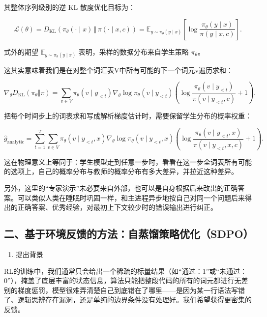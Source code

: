 其整体序列级别的逆 KL 散度优化目标为：

\[
\mathcal{L}(\theta)
= D_{\mathrm{KL}}\left(\pi_\theta(\cdot \mid x)\,\Vert\,\pi(\cdot \mid x,c)\right)
= \mathbb{E}_{y\sim \pi_\theta(y\mid x)}
\left[
\log\frac{\pi_\theta(y\mid x)}{\pi(y\mid x,c)}
\right].
\]

式外的期望 \(\mathbb{E}_{y\sim \pi_\theta(y\mid x)}\) 表明，采样的数据分布来自学生策略 \(\pi_\theta\)。

这其实意味着我们是在对整个词汇表V中所有可能的下一个词元v遍历求和：

\[
\nabla_\theta D_{\mathrm{KL}}(\pi_\theta\Vert\pi)
=
\sum_{v\in V}
\pi_\theta(v\mid y_{<t})
\nabla_\theta \log \pi_\theta(v\mid y_{<t})
\left(
\log\frac{\pi_\theta(v\mid y_{<t})}{\pi(v\mid y_{<t},c)}
+ 1
\right).
\]

把每个时间步上的词表求和写成解析梯度估计时，需要保留学生分布的概率权重：

\[
\hat{g}_{\mathrm{analytic}}
=
\sum_{t=1}^{T}\sum_{v\in V}
\pi_\theta(v\mid y_{<t},x)
\nabla_\theta \log \pi_\theta(v\mid y_{<t},x)
\left(
\log\frac{\pi_\theta(v\mid y_{<t},x)}{\pi(v\mid y_{<t},x,c)}
+1
\right).
\]

这在物理意义上等同于：学生模型走到任意一步时，看看在这一步全词表所有可能的选项上，自己的概率分布与教师的概率分布有多大差异，并拉近这种差异。

另外，这里的``专家演示''未必要来自外部，也可以是自身根据后来改出的正确答案。可以类似人类在睡眠时巩固一样，和主进程异步地按自己对同一个问题后来得出的正确答案、优秀经验，对最初上下文较少时的错误输出进行纠正。

\hypertarget{ux4e8cux57faux4e8eux73afux5883ux53cdux9988ux7684ux65b9ux6cd5ux81eaux84b8ux998fux7b56ux7565ux4f18ux5316sdpo}{%
\subsection{二、基于环境反馈的方法：自蒸馏策略优化（SDPO）}\label{ux4e8cux57faux4e8eux73afux5883ux53cdux9988ux7684ux65b9ux6cd5ux81eaux84b8ux998fux7b56ux7565ux4f18ux5316sdpo}}

\begin{enumerate}
\def\labelenumi{\arabic{enumi}.}
\tightlist
\item
  提出背景
\end{enumerate}

RL的训练中，我们通常只会给出一个稀疏的标量结果（如``通过：1''或``未通过：0''），掩盖了底层丰富的状态信息，算法只能把整段代码的所有的词元都进行无差别的梯度惩罚，模型很难弄清楚自己到底错在了哪里------是因为某一行语法写错了、逻辑思辨存在漏洞，还是单纯的边界条件没有处理好。我们希望获得更密集的反馈。

